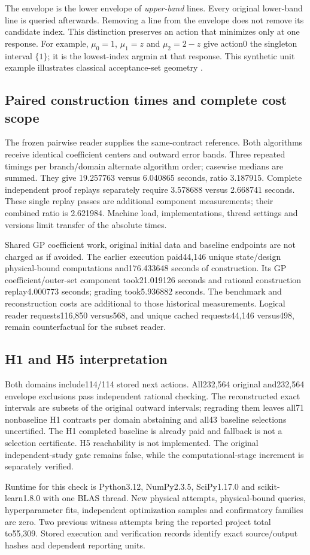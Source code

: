 The envelope is the lower envelope of \emph{upper-band} lines. Every original lower-band line is queried afterwards. Removing a line from the envelope does not remove its candidate index. This distinction preserves an action that minimizes only at one response. For example, $\mu_0=1$, $\mu_1=z$ and $\mu_2=2-z$ give action0 the singleton interval $\{1\}$; it is the lowest-index argmin at that response. This synthetic unit example illustrates classical acceptance-set geometry \citep{ref40,ref42}.

\subsection{Paired construction times and complete cost scope}
The frozen pairwise reader supplies the same-contract reference. Both algorithms receive identical coefficient centers and outward error bands. Three repeated timings per branch/domain alternate algorithm order; casewise medians are summed. They give 19.257763 versus 6.040865 seconds, ratio 3.187915. Complete independent proof replays separately require 3.578688 versus 2.668741 seconds. These single replay passes are additional component measurements; their combined ratio is 2.621984. Machine load, implementations, thread settings and versions limit transfer of the absolute times.

Shared GP coefficient work, original initial data and baseline endpoints are not charged as if avoided. The earlier execution paid44,146 unique state/design physical-bound computations and176.433648 seconds of construction. Its GP coefficient/outer-set component took21.019126 seconds and rational construction replay4.000773 seconds; grading took5.936882 seconds. The benchmark and reconstruction costs are additional to those historical measurements. Logical reader requests116,850 versus568, and unique cached requests44,146 versus498, remain counterfactual for the subset reader.

\subsection{H1 and H5 interpretation}
Both domains include114/114 stored next actions. All232,564 original and232,564 envelope exclusions pass independent rational checking. The reconstructed exact intervals are subsets of the original outward intervals; regrading them leaves all71 nonbaseline H1 contrasts per domain abstaining and all43 baseline selections uncertified. The H1 completed baseline is already paid and fallback is not a selection certificate. H5 reachability is not implemented. The original independent-study gate remains false, while the computational-stage increment is separately verified.

Runtime for this check is Python3.12, NumPy2.3.5, SciPy1.17.0 and scikit-learn1.8.0 with one BLAS thread. New physical attempts, physical-bound queries, hyperparameter fits, independent optimization samples and confirmatory families are zero. Two previous witness attempts bring the reported project total to55,309. Stored execution and verification records identify exact source/output hashes and dependent reporting units.
